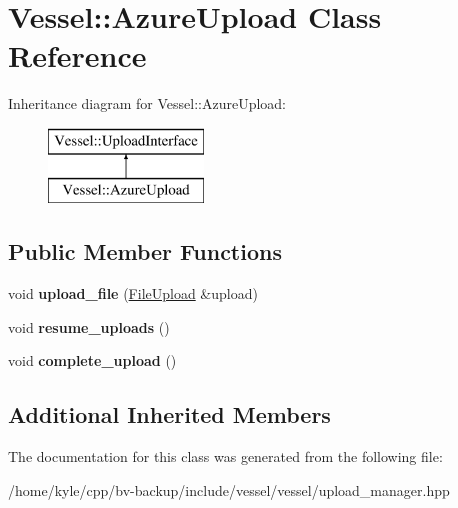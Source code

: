\hypertarget{class_vessel_1_1_azure_upload}{}\section{Vessel\+:\+:Azure\+Upload Class Reference}
\label{class_vessel_1_1_azure_upload}
Inheritance diagram for Vessel\+:\+:Azure\+Upload\+:\begin{figure}[H]
\begin{center}
\leavevmode
\includegraphics[height=2.000000cm]{class_vessel_1_1_azure_upload}
\end{center}
\end{figure}
\subsection*{Public Member Functions}
\begin{DoxyCompactItemize}
\item 
\mbox{\label{class_vessel_1_1_azure_upload_a42a56b9e6dbab4ba1fc68bad4d8806e2}} 
void {\bfseries upload\+\_\+file} (\hyperlink{class_vessel_1_1_file_1_1_file_upload}{File\+Upload} \&upload)
\item 
\mbox{\label{class_vessel_1_1_azure_upload_a26daa8e957193d45238eda00019b4ace}} 
void {\bfseries resume\+\_\+uploads} ()
\item 
\mbox{\label{class_vessel_1_1_azure_upload_a42be14aaf7b366bc06733adcc330cf0f}} 
void {\bfseries complete\+\_\+upload} ()
\end{DoxyCompactItemize}
\subsection*{Additional Inherited Members}


The documentation for this class was generated from the following file\+:\begin{DoxyCompactItemize}
\item 
/home/kyle/cpp/bv-\/backup/include/vessel/vessel/upload\+\_\+manager.\+hpp\end{DoxyCompactItemize}
